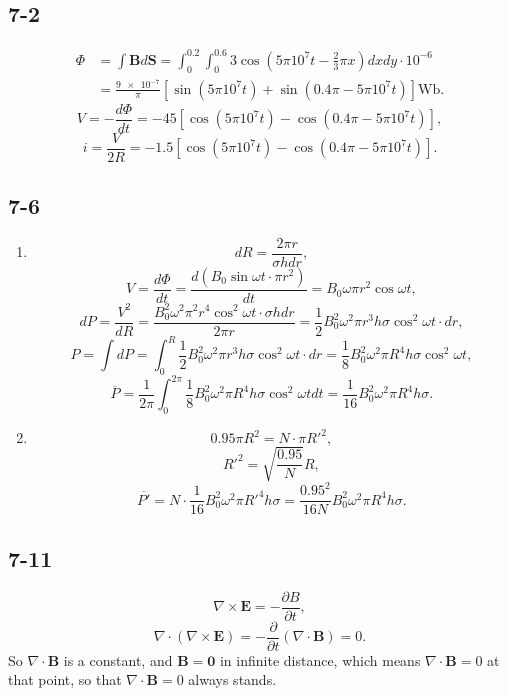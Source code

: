 \documentclass[11pt,a4paper]{article}
\author{\href{liuyh615@sjtu.edu.cn}{Yihao Liu} (515370910207)}
\subtitle{Homework}
\begin{document}
\maketitle

\subsection{7-2}
\begin{align*}
\Phi&=\int\mathbf{B}d\mathbf{S}=\int_0^{0.2}\int_0^{0.6}3\cos\left(5\pi10^7t-\frac{2}{3}\pi x\right)dxdy\cdot10^{-6}\\&=\frac{\num{9e-7}}{\pi}[\sin(5\pi10^7t)+\sin(0.4\pi-5\pi10^7t)]\si{\weber}.
\end{align*}
$$V=-\frac{d\Phi}{dt}=-45[\cos(5\pi10^7t)-\cos(0.4\pi-5\pi10^7t)],$$
$$i=\frac{V}{2R}=-1.5[\cos(5\pi10^7t)-\cos(0.4\pi-5\pi10^7t)].$$

\subsection{7-6}
\begin{enumerate}[label=\alph*)]
\item
$$dR=\frac{2\pi r}{\sigma hdr},$$
$$V=\frac{d\Phi}{dt}=\frac{d(B_0\sin\omega t\cdot \pi r^2)}{dt}=B_0\omega\pi r^2\cos\omega t,$$
$$dP=\frac{V^2}{dR}=\frac{B_0^2\omega^2\pi^2 r^4\cos^2\omega t\cdot\sigma hdr}{2\pi r}=\frac{1}{2}B_0^2\omega^2\pi r^3h\sigma\cos^2\omega t\cdot dr,$$
$$P=\int dP=\int_0^R\frac{1}{2}B_0^2\omega^2\pi r^3h\sigma\cos^2\omega t\cdot dr=\frac{1}{8}B_0^2\omega^2\pi R^4h\sigma\cos^2\omega t,$$
$$\overline{P}=\frac{1}{2\pi}\int_0^{2\pi}\frac{1}{8}B_0^2\omega^2\pi R^4h\sigma\cos^2\omega t dt=\frac{1}{16}B_0^2\omega^2\pi R^4h\sigma.$$
\item
$$0.95\pi R^2=N\cdot \pi R'^2,$$
$$R'^2=\sqrt{\frac{0.95}{N}}R,$$
$$\overline{P'}=N\cdot\frac{1}{16}B_0^2\omega^2\pi R'^4h\sigma=\frac{0.95^2}{16N}B_0^2\omega^2\pi R^4h\sigma.$$
\end{enumerate}

\subsection{7-11}
$$\nabla\times\mathbf{E}=-\frac{\partial B}{\partial t},$$
$$\nabla\cdot(\nabla\times\mathbf{E})=-\frac{\partial}{\partial t}(\nabla\cdot\mathbf{B})=0.$$
So $\nabla\cdot\mathbf{B}$ is a constant, and $\mathbf{B}=\mathbf{0}$ in infinite distance, which means $\nabla\cdot\mathbf{B}=0$ at that point, so that $\nabla\cdot\mathbf{B}=0$ always stands.
\end{document}

